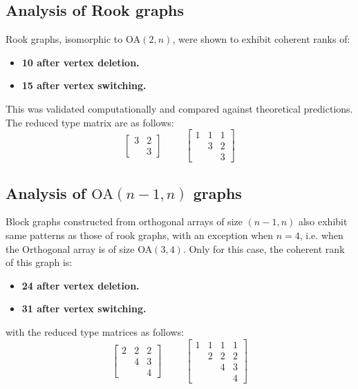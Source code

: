 \documentclass[12pt]{article}
\begin{document}
\subsection{Analysis of Rook graphs}
Rook graphs, isomorphic to \(\text{OA}(2, n)\), were shown to exhibit coherent ranks of:
\begin{itemize}
    \item \textbf{10 after vertex deletion.}
    \item \textbf{15 after vertex switching.}
\end{itemize}
This was validated computationally and compared against theoretical predictions.
The reduced type matrix are as follows:
\[
\begin{bmatrix}
  3 & 2 \\
    & 3
\end{bmatrix}
\hspace{1cm}
\begin{bmatrix}
  1 & 1 & 1 \\
    & 3 & 2 \\
    &   & 3
\end{bmatrix}
\]

\subsection{Analysis of \(\text{OA}(n-1, n)\) graphs}
Block graphs constructed from orthogonal arrays of size $(n-1, n)$ also exhibit same patterns as those of rook graphs, with an exception when \(n = 4\), i.e. when the Orthogonal array is of size OA\((3,4)\). Only for this case, the coherent rank of this graph is:
\begin{itemize}
    \item \textbf{24 after vertex deletion.}
    \item \textbf{31 after vertex switching.}
\end{itemize}
with the reduced type matrices as follows:
\[
\begin{bmatrix}
  2 & 2 & 2 \\
    & 4 & 3 \\
    &   & 4
\end{bmatrix}
\hspace{1cm}
\begin{bmatrix}
  1 & 1 & 1 & 1 \\
    & 2 & 2 & 2 \\
    &   & 4 & 3 \\
    &   &   & 4
\end{bmatrix}
\]
\end{document}
